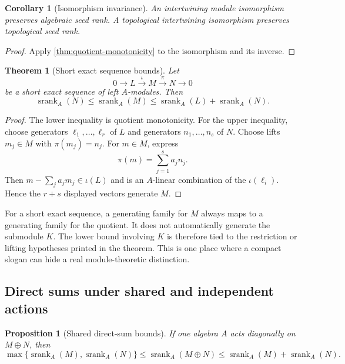 \documentclass[11pt]{article}
\newtheorem{theorem}{Theorem}[section]
\newtheorem{proposition}[proposition]{Proposition}
\newtheorem{corollary}[corollary]{Corollary}
\theoremstyle{definition}
\theoremstyle{remark}
\theoremstyle{definition}\newtheorem{example}[theorem]{Example}
\newcommand{\srank}{\operatorname{srank}}
\newcommand{\RecordID}[1]{\label{record:#1}}
\newcommand{\Depends}[1]{}
\begin{document}
\begin{corollary}[Isomorphism invariance]
\label{cor:isomorphism-invariance}
An intertwining module isomorphism preserves algebraic seed rank.  A topological intertwining isomorphism preserves topological seed rank.
\end{corollary}
\RecordID{PSC-I-C-ISOMORPHISM-INVARIANCE}
\Depends{PSC-I-T-QUOTIENT-MONOTONICITY.}

\begin{proof}
Apply \cref{thm:quotient-monotonicity} to the isomorphism and its inverse.
\end{proof}

\begin{theorem}[Short exact sequence bounds]
\label{thm:exact-sequence-bounds}
Let
\[
0\longrightarrow L\xrightarrow{\iota}M\xrightarrow{\pi}N\longrightarrow0
\]
be a short exact sequence of left $A$-modules.  Then
\[
\boxed{
\srank_A(N)\leq\srank_A(M)
\leq\srank_A(L)+\srank_A(N).
}
\]
\end{theorem}
\RecordID{PSC-I-T-EXACT-SEQUENCE-BOUNDS}
\Depends{PSC-I-T-QUOTIENT-MONOTONICITY.}

\begin{proof}
The lower inequality is quotient monotonicity.  For the upper inequality, choose generators $\ell_1,\ldots,\ell_r$ of $L$ and generators $n_1,\ldots,n_s$ of $N$.  Choose lifts $m_j\in M$ with $\pi(m_j)=n_j$.  For $m\in M$, express
\[
\pi(m)=\sum_{j=1}^sa_jn_j.
\]
Then $m-\sum_ja_jm_j\in\iota(L)$ and is an $A$-linear combination of the $\iota(\ell_i)$.  Hence the $r+s$ displayed vectors generate $M$.
\end{proof}

\begin{hypothesisguide}
For a short exact sequence, a generating family for \(M\) always maps to a generating family for the quotient.  It does not automatically generate the submodule \(K\).  The lower bound involving \(K\) is therefore tied to the restriction or lifting hypotheses printed in the theorem.  This is one place where a compact slogan can hide a real module-theoretic distinction.
\end{hypothesisguide}


\subsection{Direct sums under shared and independent actions}
\begin{proposition}[Shared direct-sum bounds]
\label{prop:shared-direct-sum}
If one algebra $A$ acts diagonally on $M\oplus N$, then
\[
\boxed{
\max\{\srank_A(M),\srank_A(N)\}
\leq\srank_A(M\oplus N)
\leq\srank_A(M)+\srank_A(N).
}
\]
\end{proposition}
\RecordID{PSC-I-P-SHARED-DIRECT-SUM}
\Depends{PSC-I-T-QUOTIENT-MONOTONICITY.}
\end{document}
